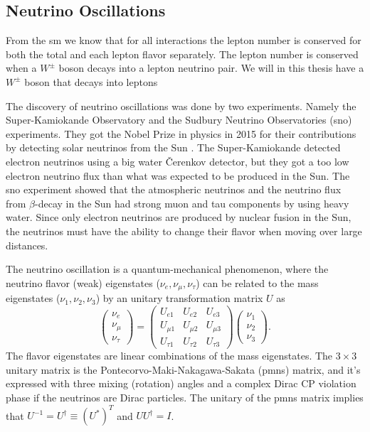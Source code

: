 \documentclass[a4paper, american, 12pt]{report}
\begin{document}
	
	\subsection{Neutrino Oscillations}
	\label{subsect:Theory-N_oscillations}
	From the \acrshort{sm} we know that for all interactions the lepton number is conserved for both the total and each lepton flavor separately. The lepton number is conserved when a $W^{\pm}$ boson decays into a lepton neutrino pair. We will in this thesis have a $W^{\pm}$ boson that decays into leptons
	
	The discovery of neutrino oscillations was done by two experiments. Namely the Super-Kamiokande Observatory\cite{superkamiokande} and the Sudbury Neutrino Observatories (\acrshort{sno})\cite{SNO} experiments. They got the Nobel Prize in physics in 2015 for their contributions by detecting solar neutrinos from the Sun \cite{gibney2015neutrino}. The Super-Kamiokande detected electron neutrinos using a big water \v{C}erenkov detector, but they got a too low electron neutrino flux than what was expected to be produced in the Sun. The \acrshort{sno} experiment showed that the atmospheric neutrinos and the neutrino flux from $\beta$-decay in the Sun had strong muon and tau components by using heavy water. Since only electron neutrinos are produced by nuclear fusion in the Sun, the neutrinos must have the ability to change their flavor when moving over large distances.
	
	The neutrino oscillation is a quantum-mechanical phenomenon, where the neutrino flavor (weak) eigenstates ($\nu_e, \nu_{\mu}, \nu_{\tau}$) can be related to the mass eigenstates ($\nu_1, \nu_{2}, \nu_{3}$) by an unitary transformation matrix $U$ as 
	\begin{equation*}
	\label{eq:Flavor_states}
		\begin{pmatrix}
		\nu_e \\ \nu_{\mu} \\ \nu_{\tau}
		\end{pmatrix} 
		= \begin{pmatrix}
		U_{e1} & U_{e2} & U_{e3} \\
		U_{\mu1} & U_{\mu2} & U_{\mu3} \\
		U_{\tau1} & U_{\tau2} & U_{\tau3}
		\end{pmatrix}
		\begin{pmatrix}
		\nu_1 \\ \nu_{2} \\ \nu_{3}
		\end{pmatrix}.
	\end{equation*} 
	The flavor eigenstates are linear combinations of the mass eigenstates. The $3\times3$ unitary matrix is the Pontecorvo-Maki-Nakagawa-Sakata (\acrshort{pmns}) matrix, and  it's expressed with three mixing (rotation) angles and a complex Dirac CP violation phase if the neutrinos are Dirac particles. The unitary of the \acrshort{pmns} matrix implies that $U^{-1}=U^{\dagger}\equiv(U^*)^T$ and $UU^{\dagger}=I$.
	
\end{document}
